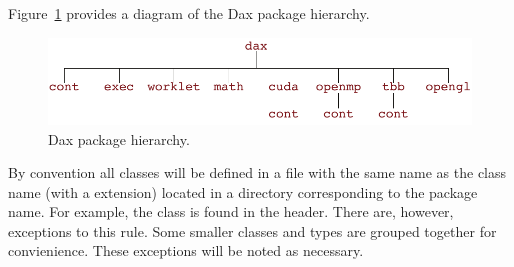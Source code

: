 Figure~\ref{fig:Packages} provides a diagram of the Dax package hierarchy.

\begin{figure}
  \centering
  \includegraphics{images/PackageHierarchy}
  \caption{Dax package hierarchy.}
  \label{fig:Packages}
\end{figure}

By convention all classes will be defined in a file with the same name as
the class name (with a  extension) located in a directory
corresponding to the package name. For example, the 
class is found in the  header. There
are, however, exceptions to this rule. Some smaller classes and types are
grouped together for convienience. These exceptions will be noted as
necessary.

